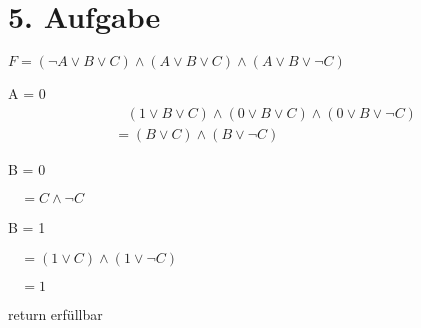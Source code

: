 \documentclass[fleqn]{article}
\begin{document}
\section{5. Aufgabe}

$F = (\neg A \vee B \vee C) \wedge (A \vee B \vee C) \wedge (A \vee B \vee \neg C)$

A = 0
\begin{equation}
\begin{split}
    & \ \ \ \ (1 \vee B \vee C) \wedge (0 \vee B \vee C) \wedge (0\vee B \vee \neg C)\\
    &= (B\vee C)\wedge (B\vee \neg C)
\end{split}
\end{equation}

B = 0

$\ \ \ \  = C \wedge \neg C$

B = 1

$ \ \ \ \ = (1\vee C)\wedge (1\vee \neg C)$

$ \ \ \ \ = 1$

return erfüllbar
\end{document}
